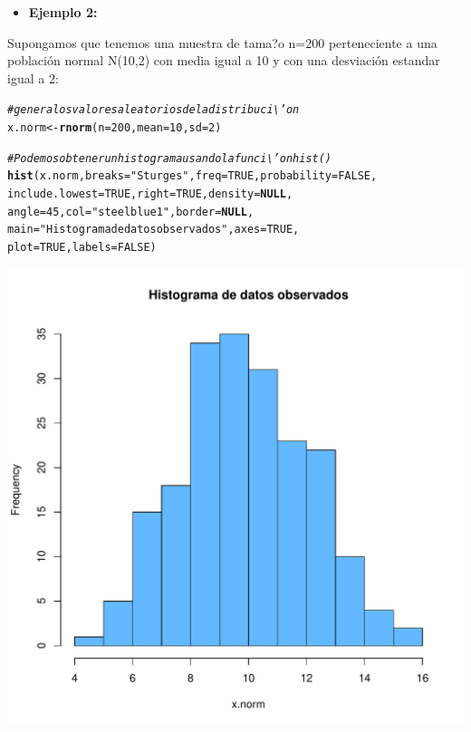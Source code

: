 \documentclass[12pt,letterpaper]{article}\usepackage[]{graphicx}\usepackage[]{color}
\makeatletter
\def\maxwidth{ %
  \ifdim\Gin@nat@width>\linewidth
    \linewidth
  \else
    \Gin@nat@width
  \fi
}
\newcommand{\hlnum}[1]{\textcolor[rgb]{0.686,0.059,0.569}{#1}}%
\newcommand{\hlstr}[1]{\textcolor[rgb]{0.192,0.494,0.8}{#1}}%
\newcommand{\hlcom}[1]{\textcolor[rgb]{0.678,0.584,0.686}{\textit{#1}}}%
\newcommand{\hlstd}[1]{\textcolor[rgb]{0.345,0.345,0.345}{#1}}%
\newcommand{\hlkwa}[1]{\textcolor[rgb]{0.161,0.373,0.58}{\textbf{#1}}}%
\newcommand{\hlkwb}[1]{\textcolor[rgb]{0.69,0.353,0.396}{#1}}%
\newcommand{\hlkwc}[1]{\textcolor[rgb]{0.333,0.667,0.333}{#1}}%
\newcommand{\hlkwd}[1]{\textcolor[rgb]{0.737,0.353,0.396}{\textbf{#1}}}%
\newenvironment{kframe}{%
 \def\at@end@of@kframe{}%
 \ifinner\ifhmode%
  \def\at@end@of@kframe{\end{minipage}}%
  \begin{minipage}{\columnwidth}%
 \fi\fi%
 \def\FrameCommand##1{\hskip\@totalleftmargin \hskip-\fboxsep
 \colorbox{shadecolor}{##1}\hskip-\fboxsep
     \hskip-\linewidth \hskip-\@totalleftmargin \hskip\columnwidth}%
 \MakeFramed {\advance\hsize-\width
   \@totalleftmargin\z@ \linewidth\hsize
   \@setminipage}}%
 {\par\unskip\endMakeFramed%
 \at@end@of@kframe}
\newenvironment{knitrout}{}{} %
\makeatother
\begin{document}
\begin{itemize}
  \item \textbf{Ejemplo 2:}
\end{itemize}
Supongamos que tenemos una muestra de tama?o n=200 perteneciente a una poblaci\'on normal N(10,2) con media igual a 10 y con una desviaci\'on estandar igual a 2:
\begin{knitrout}
\color{fgcolor}\begin{kframe}
\begin{alltt}
\hlcom{# genera los valores aleatorios de la distribuci\textbackslash{}'on }
\hlstd{x.norm} \hlkwb{<-} \hlkwd{rnorm}\hlstd{(}\hlkwc{n}\hlstd{=}\hlnum{200}\hlstd{,}\hlkwc{mean}\hlstd{=}\hlnum{10}\hlstd{,} \hlkwc{sd}\hlstd{=}\hlnum{2}\hlstd{)}

\hlcom{# Podemos obtener un histograma usando la funci\textbackslash{}'on hist() }
\hlkwd{hist}\hlstd{(x.norm,} \hlkwc{breaks} \hlstd{=} \hlstr{"Sturges"}\hlstd{,} \hlkwc{freq} \hlstd{=} \hlnum{TRUE}\hlstd{,} \hlkwc{probability} \hlstd{=} \hlnum{FALSE}\hlstd{,}
     \hlkwc{include.lowest} \hlstd{=} \hlnum{TRUE}\hlstd{,} \hlkwc{right} \hlstd{=} \hlnum{TRUE}\hlstd{,} \hlkwc{density} \hlstd{=} \hlkwa{NULL}\hlstd{,}
\hlkwc{angle} \hlstd{=} \hlnum{45}\hlstd{,} \hlkwc{col} \hlstd{=} \hlstr{"steelblue1"}\hlstd{,} \hlkwc{border} \hlstd{=} \hlkwa{NULL}\hlstd{,}
\hlkwc{main} \hlstd{=} \hlstr{"Histograma de datos observados"}\hlstd{,} \hlkwc{axes} \hlstd{=} \hlnum{TRUE}\hlstd{,}
\hlkwc{plot} \hlstd{=} \hlnum{TRUE}\hlstd{,} \hlkwc{labels} \hlstd{=} \hlnum{FALSE}\hlstd{)}
\end{alltt}
\end{kframe}
\includegraphics[width=\maxwidth]{figure/unnamed-chunk-16-1} 

\end{knitrout}
\end{document}
